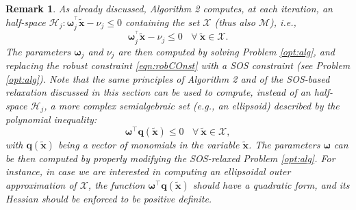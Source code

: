 \documentclass[twocolumn]{autart}
\newtheorem{remark}{Remark}{\normalfont}{\normalfont}
\newcommand{\DP}[1]{{#1}}
\newcommand{\xaug}{\tilde{\mathbf{x}}}
\begin{document}
 \begin{remark}
\DP{ As already discussed, Algorithm 2 computes, at each iteration, an half-space $\mathcal{H}_j: \boldsymbol{\omega}_j^{^\top} \xaug-\nu_j\leq 0$ containing the set $\mathcal{X}$ (thus also $\mathcal{M}$), i.e.,
 \begin{equation} \label{eqn:robCOnst}
 \boldsymbol{\omega}_j^{^\top} \xaug-\nu_j\leq 0 \ \ \ \ \forall\ \xaug \in \mathcal{X}.
 \end{equation}
 The parameters $ \boldsymbol{\omega}_j$ and $\nu_j$ are then computed by solving Problem \eqref{opt:alg}, and replacing the robust constraint \eqref{eqn:robCOnst} with a SOS constraint (see Problem \eqref{opt:alg}). Note that  the same principles of Algorithm 2 and of the SOS-based relaxation  discussed in  this section can be used to compute, instead of  an half-space $\mathcal{H}_j$, a more complex semialgebraic set (e.g., an ellipsoid) described by the polynomial inequality:
  \begin{equation} \label{eqn:robCOnst2}
 \boldsymbol{\omega}{^\top} \textbf{q}(\xaug)\leq 0 \ \ \ \ \forall\ \xaug \in \mathcal{X},
 \end{equation}
 with $\textbf{q}(\xaug)$ being a vector of monomials in the variable $\xaug$. The parameters  $\boldsymbol{\omega}$ can be then computed by properly modifying the SOS-relaxed  Problem \eqref{opt:alg}. For instance, in case we are interested in computing an ellipsoidal outer approximation of  $\mathcal{X}$, the  function  $\boldsymbol{\omega}{^\top} \textbf{q}(\xaug)$ should have a quadratic form, and its Hessian should be enforced to be positive definite.}
  \end{remark}



\end{document}
